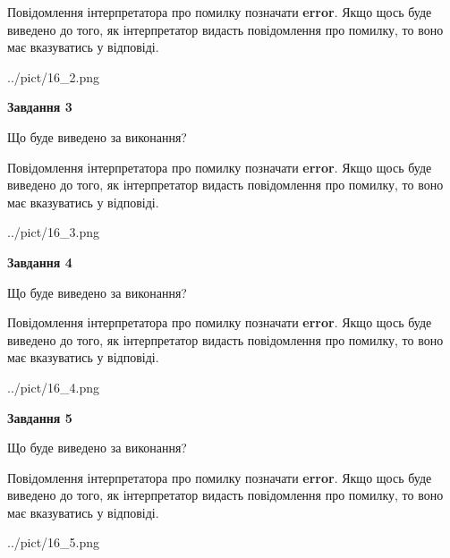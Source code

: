 \documentclass[12pt, ukrainian]{article}
\begin{document}
{\begin {large}
Повідомлення інтерпретатора про помилку позначати \textbf{error}.
Якщо щось буде виведено до того, як інтерпретатор видасть повідомлення про помилку, 
то воно має вказуватись у відповіді. \par


\begin{center}
	{../pict/16_2.png}
\end{center}
\newpage

{\begin {center}\textbf{Завдання 3}\end {center}}\par
Що буде виведено за виконання?

Повідомлення інтерпретатора про помилку позначати \textbf{error}.
Якщо щось буде виведено до того, як інтерпретатор видасть повідомлення про помилку, 
то воно має вказуватись у відповіді. \par


\begin{center}
	{../pict/16_3.png}
\end{center}
\newpage

{\begin {center}\textbf{Завдання 4}\end {center}}\par
Що буде виведено за виконання?

Повідомлення інтерпретатора про помилку позначати \textbf{error}.
Якщо щось буде виведено до того, як інтерпретатор видасть повідомлення про помилку, 
то воно має вказуватись у відповіді. \par


\begin{center}
	{../pict/16_4.png}
\end{center}
\newpage

{\begin {center}\textbf{Завдання 5}\end {center}}\par
Що буде виведено за виконання?

Повідомлення інтерпретатора про помилку позначати \textbf{error}.
Якщо щось буде виведено до того, як інтерпретатор видасть повідомлення про помилку, 
то воно має вказуватись у відповіді. \par


\begin{center}
	{../pict/16_5.png}
\end{center}
\newpage


\end{large}}
\end{document}

